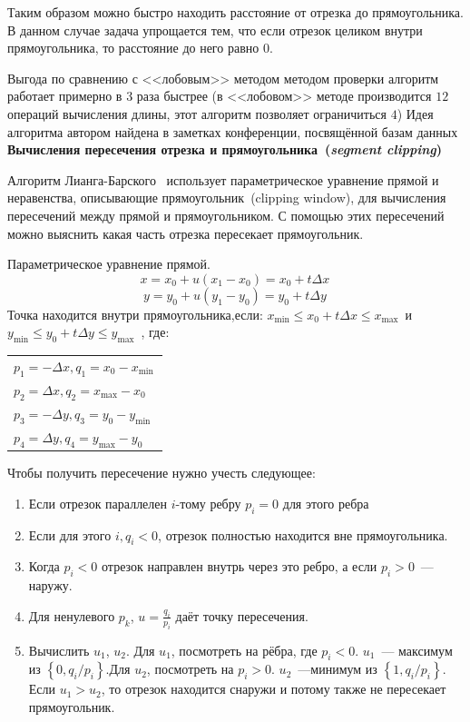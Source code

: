 Таким образом можно быстро находить расстояние от отрезка до прямоугольника. В данном случае задача упрощается тем, что если отрезок целиком внутри прямоугольника, то расстояние до него равно $0$. 

Выгода по сравнению с <<лобовым>> методом методом проверки алгоритм работает примерно в 3 раза быстрее (в <<лобовом>> методе производится $12$ операций вычисления длины, этот алгоритм позволяет ограничиться $4$)
Идея алгоритма автором найдена в заметках конференции, посвящённой базам данных \cite{seginters}
\newpage
\textbf{Вычисления пересечения отрезка и прямоугольника~(\emph{segment clipping})}

Алгоритм Лианга-Барского~\cite{barsky} использует параметрическое уравнение прямой и неравенства, описывающие прямоугольник~(clipping window), для вычисления пересечений между прямой и прямоугольником. С помощью этих пересечений можно выяснить какая часть отрезка пересекает прямоугольник.

Параметрическое уравнение прямой.
$$x = x_0 + u (x_1 - x_0) = x_0 + t \Delta x\,\!$$
$$y = y_0 + u (y_1 - y_0) = y_0 + t \Delta y\,\!$$
Точка находится внутри прямоугольника,если:
$x_{\text{min}} \le x_0 + t \Delta x \le x_{\text{max}}\,\!$
и
$y_{\text{min}} \le y_0 + t \Delta y \le y_{\text{max}}\,\!$
, где:

\begin{tabular}{l}
$p_1 = -\Delta x  , q_1 = x_0 - x_{\text{min}}\,\!$ \\
$p_2 = \Delta x  ,  q_2 = x_{\text{max}} - x_0\,\!$\\
$p_3 = -\Delta y , q_3 = y_0 - y_\text{min}\,\!$\\
$p_4 = \Delta y ,  q_4 = y_\text{max} - y_0\,\! $
\end{tabular}

Чтобы получить пересечение нужно учесть следующее:
\begin{enumerate}
\item Если отрезок параллелен $i$-тому ребру $p_i=0$  для этого ребра
\item Если для этого $i,q_i<0$, отрезок полностью находится вне прямоугольника.
\item Когда $p_i<0$ отрезок направлен внутрь через это ребро, а если $p_i>0$~---наружу.
\item Для ненулевого $p_k$, $u=\frac{q_i}{p_i}$ даёт точку пересечения.
\item Вычислить $u_1$, $u_2$. Для $u_1$, посмотреть на рёбра, где  $p_i<0$. $u_1$~--- максимум из $\left\{0,{q_i}/{p_i}\right\}$.Для $u_2$, посмотреть на $p_i>0$. $u_2$~---минимум из $\left\{1,{q_i}/{p_i}\right\}$. Если $u_1>u_2$, то отрезок находится снаружи и потому также не пересекает прямоугольник.
\end{enumerate}

